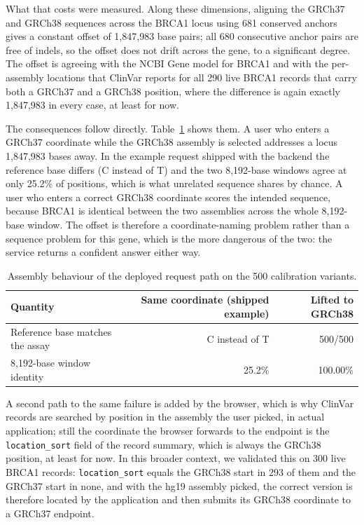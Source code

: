 \documentclass[10pt,journal]{IEEEtran}
\begin{document}
What that costs were measured. Along these dimensions, aligning the GRCh37 and GRCh38 sequences across the BRCA1 locus using 681 conserved anchors gives a constant offset of 1{,}847{,}983 base pairs; all 680 consecutive anchor pairs are free of indels, so the offset does not drift across the gene, to a significant degree. The offset is agreeing with the NCBI Gene model for BRCA1 and with the per-assembly locations that ClinVar reports for all 290 live BRCA1 records that carry both a GRCh37 and a GRCh38 position, where the difference is again exactly 1{,}847{,}983 in every case, at least for now.

The consequences follow directly. Table~\ref{tab:assembly} shows them. A user who enters a GRCh37 coordinate while the GRCh38 assembly is selected addresses a locus 1{,}847{,}983 bases away. In the example request shipped with the backend the reference base differs (C instead of T) and the two 8{,}192-base windows agree at only 25.2\% of positions, which is what unrelated sequence shares by chance. A user who enters a correct GRCh38 coordinate scores the intended sequence, because BRCA1 is identical between the two assemblies across the whole 8{,}192-base window. The offset is therefore a coordinate-naming problem rather than a sequence problem for this gene, which is the more dangerous of the two: the service returns a confident answer either way.

\begin{table}[!t]
\caption{Assembly behaviour of the deployed request path on the 500 calibration variants.}
\label{tab:assembly}
\centering
\footnotesize
\begin{tabular}{@{}lrr@{}}
\toprule
Quantity & Same coordinate (shipped example) & Lifted to GRCh38 \\
\midrule
Reference base matches the assay & C instead of T & 500/500 \\
8{,}192-base window identity & 25.2\% & 100.00\% \\
\bottomrule
\end{tabular}
\end{table}

A second path to the same failure is added by the browser, which is why ClinVar records are searched by position in the assembly the user picked, in actual application; still the coordinate the browser forwards to the endpoint is the \texttt{location\_sort} field of the record summary, which is always the GRCh38 position, at least for now. In this broader context, we validated this on 300 live BRCA1 records: \texttt{location\_sort} equals the GRCh38 start in 293 of them and the GRCh37 start in none, and with the hg19 assembly picked, the correct version is therefore located by the application and then submits its GRCh38 coordinate to a GRCh37 endpoint.
\end{document}

